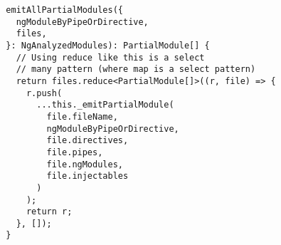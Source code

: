 \begin{verbatim}
  emitAllPartialModules({
    ngModuleByPipeOrDirective,
    files,
  }: NgAnalyzedModules): PartialModule[] {
    // Using reduce like this is a select
    // many pattern (where map is a select pattern)
    return files.reduce<PartialModule[]>((r, file) => {
      r.push(
        ...this._emitPartialModule(
          file.fileName,
          ngModuleByPipeOrDirective,
          file.directives,
          file.pipes,
          file.ngModules,
          file.injectables
        )
      );
      return r;
    }, []);
  }
\end{verbatim}
